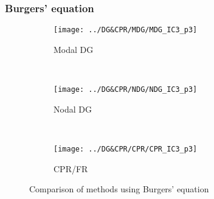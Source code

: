 \begin{frame} \frametitle{Burgers' equation}
	\begin{figure}
        \centering
        \begin{subfigure}[b]{0.31\textwidth}
                \centering
                \texttt{[image: ../DG\&CPR/MDG/MDG\_IC3\_p3]}
                \caption{Modal DG}
                \label{fig:MDG_IC3_p3_averages}
        \end{subfigure}%
				~
        \begin{subfigure}[b]{0.31\textwidth}
                \centering
                \texttt{[image: ../DG\&CPR/NDG/NDG\_IC3\_p3]}
                \caption{Nodal DG}
                \label{fig:NDG_IC3_p3_averages}
        \end{subfigure}
				~
        \begin{subfigure}[b]{0.31\textwidth}
								\centering
                \texttt{[image: ../DG\&CPR/CPR/CPR\_IC3\_p3]}
                \caption{CPR/FR}
                \label{fig:CPR_IC3_p3_averages}
        \end{subfigure}
				\caption{Comparison of methods using Burgers' equation}
				\label{fig:compareBurgers_p3averages}
	\end{figure}
\end{frame}

